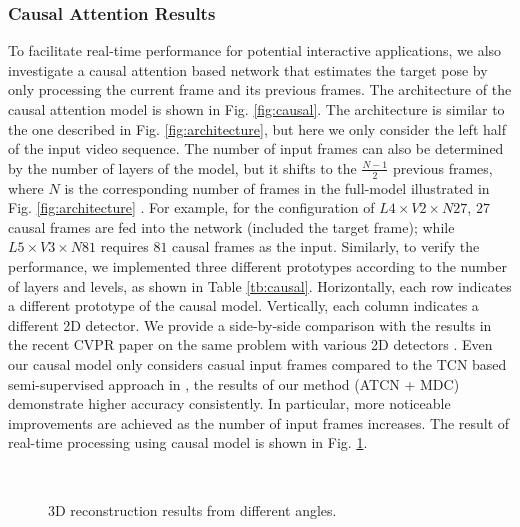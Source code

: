 \documentclass[twocolumn]{svjour3}          \smartqed  \usepackage{graphicx}
\begin{document}
\subsubsection*{\bf Causal Attention Results}
To facilitate real-time performance for potential interactive applications, we also investigate a causal attention based network that estimates the target pose by only processing the current frame and its previous frames. The architecture of the causal attention model is shown in Fig. \ref{fig:causal}. The architecture is similar to the one described in Fig. \ref{fig:architecture}, but here we only consider the left half of the input video sequence. The number of input frames can also be determined by the number of layers of the model, but it shifts to the $\frac{N-1}{2}$ previous frames, where $N$ is the corresponding number of frames in the full-model illustrated in Fig. \ref{fig:architecture} . For example, for the configuration of  $L4 \times V2 \times N27$, $27$ causal frames are fed into the network (included the target frame); while $L5 \times V3 \times N81$ requires $81$ causal frames as the input. Similarly, to verify the performance, we implemented three different prototypes according to the number of layers and levels, as shown in Table \ref{tb:causal}. Horizontally, each row indicates a different prototype of the causal model. Vertically, each column indicates a different 2D detector. We provide a side-by-side comparison with the results in the recent CVPR paper on the same problem with various 2D detectors \citep{Pavllo2019}. Even our causal model only considers casual input frames compared to the TCN based semi-supervised approach in \citep{Pavllo2019}, the results of our method (ATCN + MDC) demonstrate higher accuracy consistently. In particular, more noticeable improvements are achieved as the number of input frames increases. The result of real-time processing using causal model is shown in Fig. \ref{Multi-angle}.



\begin{figure}[]
\centering
{}
\\
\caption{3D reconstruction results from different angles.}
\label{Multi-angle}
\end{figure}
\end{document}
